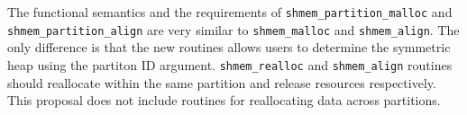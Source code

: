 The functional semantics and the requirements of
\texttt{shmem\_partition\_malloc} and \texttt{shmem\_partition\_align}
are very similar to \texttt{shmem\_malloc} and \texttt{shmem\_align}.
The only difference is that the new routines allows users to determine
the symmetric heap using the partiton ID argument. %
\texttt{shmem\_realloc} and \texttt{shmem\_align} routines should
reallocate within the same partition and release resources respectively.
This proposal does not include routines for reallocating data across
partitions.
